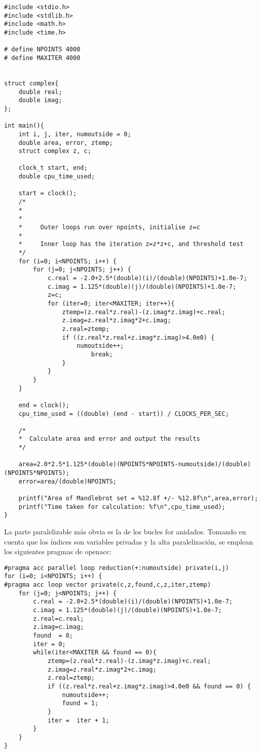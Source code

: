 \begin{lstlisting}[style=CStyle]
#include <stdio.h>
#include <stdlib.h>
#include <math.h>
#include <time.h>

# define NPOINTS 4000
# define MAXITER 4000


struct complex{
    double real;
    double imag;
};

int main(){
    int i, j, iter, numoutside = 0;
    double area, error, ztemp;
    struct complex z, c;

    clock_t start, end;
    double cpu_time_used;
        
    start = clock();
    /*
    *   
    *
    *     Outer loops run over npoints, initialise z=c
    *
    *     Inner loop has the iteration z=z*z+c, and threshold test
    */
    for (i=0; i<NPOINTS; i++) {
        for (j=0; j<NPOINTS; j++) {
            c.real = -2.0+2.5*(double)(i)/(double)(NPOINTS)+1.0e-7;
            c.imag = 1.125*(double)(j)/(double)(NPOINTS)+1.0e-7;
            z=c;
            for (iter=0; iter<MAXITER; iter++){
                ztemp=(z.real*z.real)-(z.imag*z.imag)+c.real;
                z.imag=z.real*z.imag*2+c.imag; 
                z.real=ztemp; 
                if ((z.real*z.real+z.imag*z.imag)>4.0e0) {
                    numoutside++;
                        break; 
                }
            }
        }
    }

    end = clock();
    cpu_time_used = ((double) (end - start)) / CLOCKS_PER_SEC;

    /*
    *  Calculate area and error and output the results
    */

    area=2.0*2.5*1.125*(double)(NPOINTS*NPOINTS-numoutside)/(double)(NPOINTS*NPOINTS);
    error=area/(double)NPOINTS;

    printf("Area of Mandlebrot set = %12.8f +/- %12.8f\n",area,error);
    printf("Time taken for calculation: %f\n",cpu_time_used);    
}    
\end{lstlisting}

La parte paralelizable más obvia es la de los bucles for anidados. Tomando en cuenta que los índices son variables privadas y la alta paralelización, se emplean los siguientes pragmas de openacc:

\begin{lstlisting}[style=CStyle]
#pragma acc parallel loop reduction(+:numoutside) private(i,j) 
for (i=0; i<NPOINTS; i++) {
#pragma acc loop vector private(c,z,found,c,z,iter,ztemp)
    for (j=0; j<NPOINTS; j++) {
        c.real = -2.0+2.5*(double)(i)/(double)(NPOINTS)+1.0e-7;
        c.imag = 1.125*(double)(j)/(double)(NPOINTS)+1.0e-7;
        z.real=c.real;
        z.imag=c.imag;
        found  = 0;
        iter = 0;
        while(iter<MAXITER && found == 0){
            ztemp=(z.real*z.real)-(z.imag*z.imag)+c.real;
            z.imag=z.real*z.imag*2+c.imag; 
            z.real=ztemp; 
            if ((z.real*z.real+z.imag*z.imag)>4.0e0 && found == 0) {
                numoutside++; 
                found = 1;
            }
            iter =  iter + 1;
        }
    }
}
\end{lstlisting}


